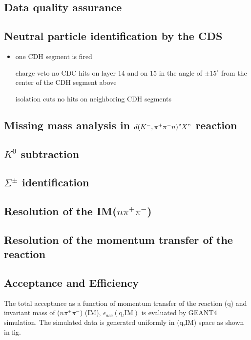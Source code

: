 \subsection{Data quality assurance}


\subsection{Neutral particle identification by the CDS}
\begin{itemize}
\item one CDH segment is fired
\item [charge veto] no CDC hits on layer 14 and on 15 in the angle of $\pm 15^\circ$ from the center of the CDH segment above
\item [isolation cuts] no hits on neighboring CDH segments
\end{itemize}

\subsection{Missing mass analysis in $d(K^-,\pi^+\pi^-n)"X"$ reaction}

\subsection{$K^0$ subtraction}


\subsection{$\Sigma^{\pm}$ identification}

\subsection{Resolution of the IM($n\pi^{+}\pi^{-}$)}

\subsection{Resolution of the momentum transfer of the reaction}

\subsection{Acceptance and Efficiency}
The total acceptance as a function of momentum transfer of the reaction (q) and invariant mass of ($n\pi^+\pi^-$) (IM), $\epsilon_{acc}(\mbox{q,IM})$ is evaluated by GEANT4 simulation.
The simulated data is generated uniformly in (q,IM) space as shown in fig. 

